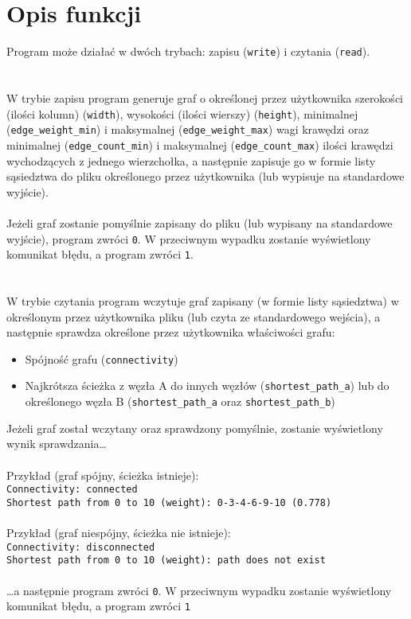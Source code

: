 \documentclass[11pt,a4paper]{report}
\begin{document}
    \section{Opis funkcji}
    Program może działać w dwóch trybach: zapisu (\verb|write|) i czytania (\verb|read|).\\
    \\
    \\
    W trybie zapisu program generuje graf o określonej przez użytkownika szerokości (ilości kolumn) (\verb|width|), wysokości (ilości wierszy) (\verb|height|), minimalnej (\verb|edge_weight_min|) i maksymalnej (\verb|edge_weight_max|) wagi krawędzi oraz minimalnej (\verb|edge_count_min|) i maksymalnej (\verb|edge_count_max|) ilości krawędzi wychodzących z jednego wierzchołka, a następnie zapisuje go w formie listy sąsiedztwa do pliku określonego przez użytkownika (lub wypisuje na standardowe wyjście).\\
    \\
    Jeżeli graf zostanie pomyślnie zapisany do pliku (lub wypisany na standardowe wyjście), program zwróci \verb|0|. W przeciwnym wypadku zostanie wyświetlony komunikat błędu, a program zwróci \verb|1|.\\
    \\
    \\
    W trybie czytania program wczytuje graf zapisany (w formie listy sąsiedztwa) w określonym przez użytkownika pliku (lub czyta ze standardowego wejścia), a następnie sprawdza określone przez użytkownika właściwości grafu:
    \begin{itemize}
        \item Spójność grafu (\verb|connectivity|)
        \item Najkrótsza ścieżka z węzła A do innych węzłów (\verb|shortest_path_a|) lub do określonego węzła B (\verb|shortest_path_a| oraz \verb|shortest_path_b|)
    \end{itemize}
    Jeżeli graf został wczytany oraz sprawdzony pomyślnie, zostanie wyświetlony wynik sprawdzania…\\
    \\
    Przykład (graf spójny, ścieżka istnieje):\\
    \verb|Connectivity: connected|\\
    \verb|Shortest path from 0 to 10 (weight): 0-3-4-6-9-10 (0.778)|\\
    \\
    Przykład (graf niespójny, ścieżka nie istnieje):\\
    \verb|Connectivity: disconnected|\\
    \verb|Shortest path from 0 to 10 (weight): path does not exist|\\
    \\
    …a następnie program zwróci \verb|0|. W przeciwnym wypadku zostanie wyświetlony komunikat błędu, a program zwróci \verb|1|
\end{document}
